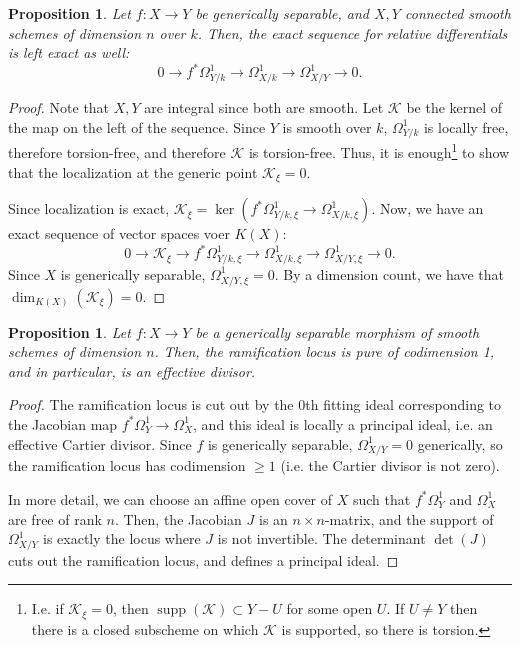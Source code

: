 \documentclass[10pt]{article}
\newtheorem{prop}[thm]{Proposition}
\theoremstyle{definition}
\DeclareMathOperator{\supp}{supp}
\begin{document}
\begin{prop}
Let $f: X \rightarrow Y$ be generically separable, and $X, Y$ connected smooth schemes of dimension $n$ over $k$.  Then, the exact sequence for relative differentials is left exact as well:
$$0 \rightarrow f^* \Omega^1_{Y/k} \rightarrow \Omega^1_{X/k} \rightarrow \Omega^1_{X/Y} \rightarrow 0.$$
\end{prop}
\begin{proof}
Note that $X, Y$ are integral since both are smooth. 
 Let $\mathcal{K}$ be the kernel of the map on the left of the sequence. 
  Since $Y$ is smooth over $k$, $\Omega^1_{Y/k}$ is locally free, therefore torsion-free, and therefore $\mathcal{K}$ is torsion-free. 
   Thus, it is enough\footnote{I.e. if $\mathcal{K}_\xi = 0$, then $\supp(\mathcal{K}) \subset Y - U$ for some open $U$.  If $U \neq Y$ then there is a closed subscheme on which $\mathcal{K}$ is supported, so there is torsion.} to show that the localization at the generic point $\mathcal{K}_\xi = 0$.

Since localization is exact, $\mathcal{K}_\xi = \ker(f^* \Omega^1_{Y/k,\xi} \rightarrow \Omega^1_{X/k, \xi})$.  Now, we have an exact sequence of vector spaces voer $K(X)$:
$$0 \rightarrow \mathcal{K}_\xi \rightarrow f^* \Omega^1_{Y/k,\xi} \rightarrow \Omega^1_{X/k, \xi} \rightarrow \Omega^1_{X/Y, \xi} \rightarrow 0.$$
Since $X$ is generically separable, $\Omega^1_{X/Y,\xi} = 0$.  By a dimension count, we have that $\dim_{K(X)}(\mathcal{K}_\xi) = 0$.
\end{proof}

\begin{prop}
Let $f: X \rightarrow Y$ be a generically separable morphism of smooth schemes of dimension $n$.  Then, the ramification locus is pure of codimension 1, and in particular, is an effective divisor.
\end{prop}
\begin{proof}
The ramification locus is cut out by the 0th fitting ideal corresponding to the Jacobian map $f^* \Omega^1_Y \rightarrow \Omega^1_X$, and this ideal is locally a principal ideal, i.e. an effective Cartier divisor.  Since $f$ is generically separable, $\Omega^1_{X/Y} = 0$ generically, so the ramification locus has codimension $\geq 1$ (i.e. the Cartier divisor is not zero).

In more detail, we can choose an affine open cover of $X$ such that $f^*\Omega^1_Y$ and $\Omega^1_X$ are free of rank $n$.  Then, the Jacobian $J$ is an $n \times n$-matrix, and the support of $\Omega^1_{X/Y}$ is exactly the locus where $J$ is not invertible.  The determinant $\det(J)$ cuts out the ramification locus, and defines a principal ideal.
\end{proof}
\end{document}
